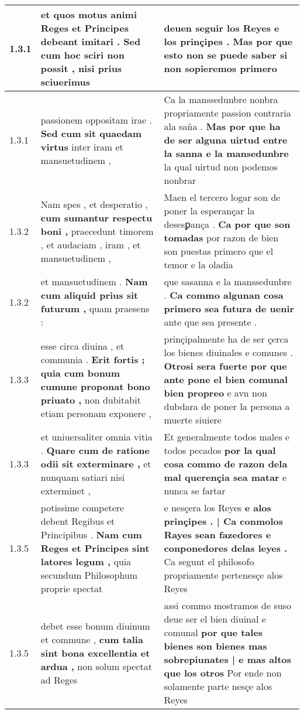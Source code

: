 \begin{tabular}{|p{1cm}|p{6.5cm}|p{6.5cm}|}
1.3.1 & et quos motus animi Reges et Principes debeant imitari . \textbf{ Sed cum hoc sciri non possit , } nisi prius sciuerimus & deuen seguir los Reyes e los prinçipes . \textbf{ Mas por que esto non se puede saber } si non sopieremos primero \\\hline
1.3.1 & passionem oppositam irae . \textbf{ Sed cum sit quaedam virtus } inter iram et mansuetudinem , & Ca la manssedunbre nonbra propriamente passion contraria ala saña . \textbf{ Mas por que ha de ser alguna uirtud entre la sanna e la mansedunbre } la qual uirtud non podemos nonbrar \\\hline
1.3.2 & Nam spes , et desperatio , \textbf{ cum sumantur respectu boni , } praecedunt timorem , et audaciam , iram , et mansuetudinem , & Maen el tercero logar son de poner la esperançar la desesꝑança . \textbf{ Ca por que son tomadas } por razon de bien son puestas primero que el temor e la oladia \\\hline
1.3.2 & et mansuetudinem . \textbf{ Nam cum aliquid prius sit futurum , } quam praesens : & que sasanna e la manssedunbre . \textbf{ Ca commo algunan cosa primero sea futura de uenir } ante que sea presente . \\\hline
1.3.3 & esse circa diuina , et communia . \textbf{ Erit fortis ; quia cum bonum cumune proponat bono priuato , } non dubitabit etiam personam exponere , & prinçipalmente ha de ser çerca los bienes diuinales e comunes . \textbf{ Otrosi sera fuerte por que ante pone el bien comunal bien propreo } e avn non dubdara de poner la persona a muerte siuiere \\\hline
1.3.3 & et uniuersaliter omnia vitia . \textbf{ Quare cum de ratione odii sit exterminare , } et nunquam satiari nisi exterminet , & Et generalmente todos males e todos pecados \textbf{ por la qual cosa commo de razon dela mal querençia sea matar } e nunca se fartar \\\hline
1.3.5 & potissime competere debent Regibus et Principibus . \textbf{ Nam cum Reges et Principes sint latores legum , } quia secundum Philosophum proprie spectat & e nesçera los Reyes \textbf{ e alos prinçipes . | Ca conmolos Rayes sean fazedores e conponedores delas leyes . } Ca segunt el philosofo propriamente pertenesçe alos Reyes \\\hline
1.3.5 & debet esse bonum diuinum et commune , \textbf{ cum talia sint bona excellentia et ardua , } non solum spectat ad Reges & assi commo mostramos de suso deue ser el bien diuinal e comunal \textbf{ por que tales bienes son bienes mas sobrepiunates | e mas altos que los otros } Por ende non solamente parte nesçe alos Reyes \\\hline

\end{tabular}
